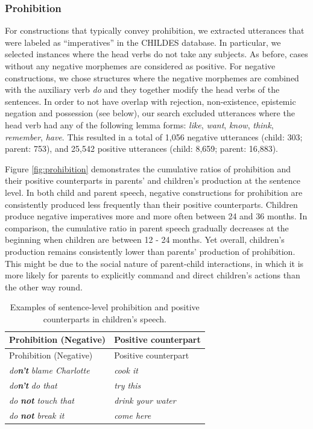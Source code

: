 \documentclass[
  english,
  man,floatsintext]{apa6}
\begin{document}
\hypertarget{prohibition}{%
\subsubsection{Prohibition}\label{prohibition}}

For constructions that typically convey prohibition, we extracted utterances that were labeled as ``imperatives'' in the CHILDES database. In particular, we selected instances where the head verbs do not take any subjects. As before, cases without any negative morphemes are considered as positive. For negative constructions, we chose structures where the negative morphemes are combined with the auxiliary verb \emph{do} and they together modify the head verbs of the sentences. In order to not have overlap with rejection, non-existence, epistemic negation and possession (see below), our search excluded utterances where the head verb had any of the following lemma forms: \emph{like}, \emph{want}, \emph{know}, \emph{think}, \emph{remember}, \emph{have}. This resulted in a total of 1,056 negative utterances (child: 303; parent: 753), and 25,542 positive utterances (child: 8,659; parent: 16,883).

Figure \ref{fig:prohibition} demonstrates the cumulative ratios of prohibition and their positive counterparts in parents' and children's production at the sentence level. In both child and parent speech, negative constructions for prohibition are consistently produced less frequently than their positive counterparts. Children produce negative imperatives more and more often between 24 and 36 months. In comparison, the cumulative ratio in parent speech gradually decreases at the beginning when children are between 12 - 24 months. Yet overall, children's production remains consistently lower than parents' production of prohibition. This might be due to the social nature of parent-child interactions, in which it is more likely for parents to explicitly command and direct children's actions than the other way round.

\begin{longtable}[]{@{}ll@{}}
\caption{\label{tab:prohibit} Examples of sentence-level prohibition and positive counterparts in children's speech.}\tabularnewline
\toprule
Prohibition (Negative) & Positive counterpart \\
\midrule
\endfirsthead
\toprule
Prohibition (Negative) & Positive counterpart \\
\midrule
\endhead
\emph{do}\textbf{\emph{n't}} \emph{blame Charlotte} & \emph{cook it} \\
\emph{do}\textbf{\emph{n't}} \emph{do that} & \emph{try this} \\
\emph{do} \textbf{\emph{not}} \emph{touch that} & \emph{drink your water} \\
\emph{do} \textbf{\emph{not}} \emph{break it} & \emph{come here} \\
\bottomrule
\end{longtable}
\end{document}
